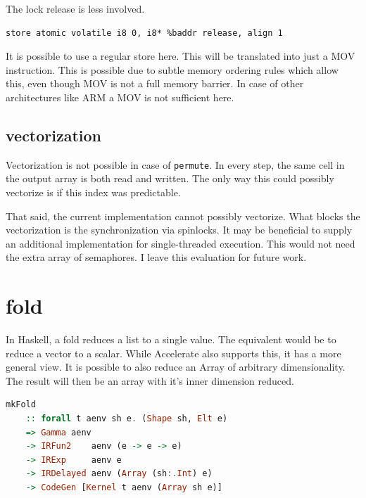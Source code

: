 \documentclass[a4paper,bibliography=totocnumbered,parskip,headsepline]{scrbook}
\begin{document}
The lock release is less involved.
\begin{lstlisting}
store atomic volatile i8 0, i8* %baddr release, align 1
\end{lstlisting}
It is possible to use a regular store here.
This will be translated into just a MOV instruction.
This is possible due to subtle memory ordering rules which allow this, even though MOV is not a full memory barrier.
In case of other architectures like ARM a MOV is not sufficient here.

\subsection*{vectorization}
Vectorization is not possible in case of \lstinline[language=haskell]!permute!.
In every step, the same cell in the output array is both read and written.
The only way this could possibly vectorize is if this index was predictable.

That said, the current implementation cannot possibly vectorize.
What blocks the vectorization is the synchronization via spinlocks.
It may be beneficial to supply an additional implementation for single-threaded execution.
This would not need the extra array of semaphores.
I leave this evaluation for future work.

\section{fold}
In Haskell, a fold reduces a list to a single value.
The equivalent would be to reduce a vector to a scalar.
While Accelerate also supports this, it has a more general view.
It is possible to also reduce an Array of arbitrary dimensionality.
The result will then be an array with it's inner dimension reduced.

\begin{lstlisting}[language=haskell]
mkFold
    :: forall t aenv sh e. (Shape sh, Elt e)
    => Gamma aenv
    -> IRFun2    aenv (e -> e -> e)
    -> IRExp     aenv e
    -> IRDelayed aenv (Array (sh:.Int) e)
    -> CodeGen [Kernel t aenv (Array sh e)]
\end{lstlisting}
\end{document}
